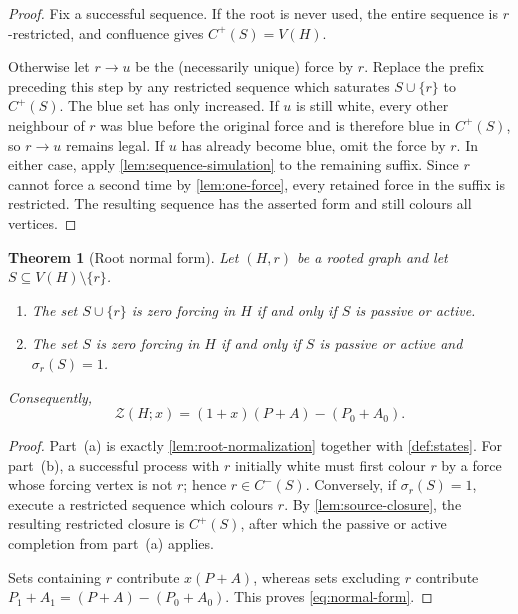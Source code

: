 \documentclass[11pt,reqno]{amsart}
\newtheorem{theorem}{Theorem}[section]
\theoremstyle{definition}
\newcommand{\Zpoly}{\mathcal Z}
\begin{document}
\begin{proof}
Fix a successful sequence.  If the root is never used, the entire sequence is
$r$-restricted, and confluence gives $C^+(S)=V(H)$.

Otherwise let $r\to u$ be the (necessarily unique) force by $r$.  Replace the
prefix preceding this step by any restricted sequence which saturates
$S\cup\{r\}$ to $C^+(S)$.  The blue set has only increased.  If $u$ is still
white, every other neighbour of $r$ was blue before the original force and is
therefore blue in $C^+(S)$, so $r\to u$ remains legal.  If $u$ has already
become blue, omit the force by $r$.  In either case, apply
\cref{lem:sequence-simulation} to the remaining suffix.  Since $r$ cannot
force a second time by \cref{lem:one-force}, every retained force in the
suffix is restricted.  The resulting sequence has the asserted form and
still colours all vertices.
\end{proof}

\begin{theorem}[Root normal form]\label{thm:normal-form}
Let $(H,r)$ be a rooted graph and let $S\subseteq V(H)\setminus\{r\}$.
\begin{enumerate}[label=\textnormal{(\alph*)}]
\item The set $S\cup\{r\}$ is zero forcing in $H$ if and only if $S$ is passive or active.
\item The set $S$ is zero forcing in $H$ if and only if $S$ is passive or active and $\sigma_r(S)=1$.
\end{enumerate}
Consequently,
\begin{equation}\label{eq:normal-form}
  \boxed{
  \Zpoly(H;x)=(1+x)(P+A)-(P_0+A_0).
  }
\end{equation}
\end{theorem}

\begin{proof}
Part~(a) is exactly \cref{lem:root-normalization} together with
\cref{def:states}.  For part~(b), a successful process with $r$ initially
white must first colour $r$ by a force whose forcing vertex is not $r$; hence
$r\in C^-(S)$.  Conversely, if $\sigma_r(S)=1$, execute a restricted sequence
which colours $r$.  By \cref{lem:source-closure}, the resulting restricted
closure is $C^+(S)$, after which the passive or active completion from
part~(a) applies.

Sets containing $r$ contribute $x(P+A)$, whereas sets excluding $r$ contribute
$P_1+A_1=(P+A)-(P_0+A_0)$.  This proves \eqref{eq:normal-form}.
\end{proof}
\end{document}
